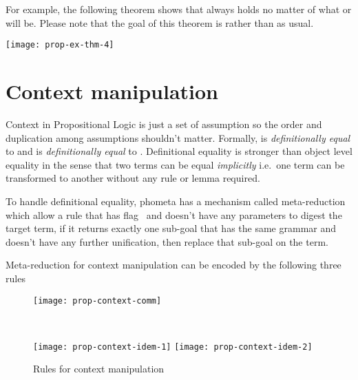 \documentclass[master.tex]{subfiles}
\begin{document}
For example, the following theorem shows that  always holds
no matter of what  or  will be. Please note that the goal of
this theorem is  rather than  as usual.

\begin{center}
  \texttt{[image: prop-ex-thm-4]}
\end{center}

\section{Context manipulation}
\label{sec:prop-context-manipulation}

Context in Propositional Logic is just a set of assumption so the order and
duplication among assumptions shouldn't matter. Formally, 
is \emph{definitionally equal} to  and
 is \emph{definitionally equal} to
. Definitional equality is stronger than object level
equality in the sense that two terms can be equal \emph{implicitly} i.e.\
one term can be transformed to another without any rule or lemma required.

To handle definitional equality, phometa has a mechanism called meta-reduction
which allow a rule that has flag \kAllowReduction\ and doesn't have any
parameters to digest the target term, if it returns exactly one sub-goal that
has the same grammar and doesn't have any further unification, then replace that
sub-goal on the term.

Meta-reduction for context manipulation can be encoded by the following three
rules

\begin{figure}[H]
    \centering

\begin{minipage}{0.48\textwidth}
\begin{flushleft}
\texttt{[image: prop-context-comm]}
\end{flushleft}
\end{minipage}
~
\begin{minipage}{0.48\textwidth}
\begin{flushright}
\texttt{[image: prop-context-idem-1]}
\texttt{[image: prop-context-idem-2]}
\end{flushright}
\end{minipage}

\caption{Rules for context manipulation}
\label{fig:prop-context-manipulation}
\end{figure}
\end{document}
